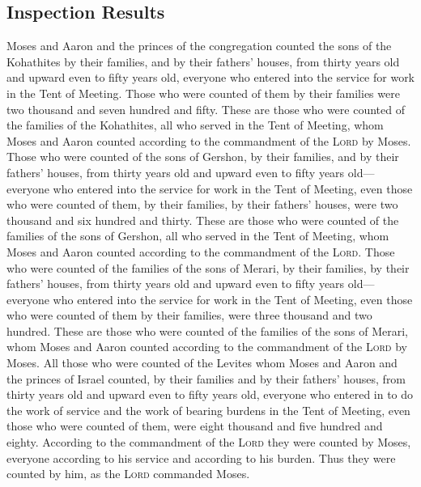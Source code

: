 \hypertarget{inspection-results}{%
\subsection{Inspection Results}\label{inspection-results}}

 Moses and Aaron and the princes of the congregation
counted the sons of the Kohathites by their families, and by their
fathers' houses,  from thirty years old and upward even
to fifty years old, everyone who entered into the service for work in
the Tent of Meeting.  Those who were counted of them by
their families were two thousand and seven hundred and fifty.
 These are those who were counted of the families of the
Kohathites, all who served in the Tent of Meeting, whom Moses and Aaron
counted according to the commandment of the \textsc{Lord} by Moses.
 Those who were counted of the sons of Gershon, by their
families, and by their fathers' houses,  from thirty
years old and upward even to fifty years old---everyone who entered into
the service for work in the Tent of Meeting,  even those
who were counted of them, by their families, by their fathers' houses,
were two thousand and six hundred and thirty.  These are
those who were counted of the families of the sons of Gershon, all who
served in the Tent of Meeting, whom Moses and Aaron counted according to
the commandment of the \textsc{Lord}.  Those who were
counted of the families of the sons of Merari, by their families, by
their fathers' houses,  from thirty years old and upward
even to fifty years old---everyone who entered into the service for work
in the Tent of Meeting,  even those who were counted of
them by their families, were three thousand and two hundred.
 These are those who were counted of the families of the
sons of Merari, whom Moses and Aaron counted according to the
commandment of the \textsc{Lord} by Moses.  All those who
were counted of the Levites whom Moses and Aaron and the princes of
Israel counted, by their families and by their fathers' houses,
 from thirty years old and upward even to fifty years
old, everyone who entered in to do the work of service and the work of
bearing burdens in the Tent of Meeting,  even those who
were counted of them, were eight thousand and five hundred and eighty.
 According to the commandment of the \textsc{Lord} they
were counted by Moses, everyone according to his service and according
to his burden. Thus they were counted by him, as the \textsc{Lord}
commanded Moses.

